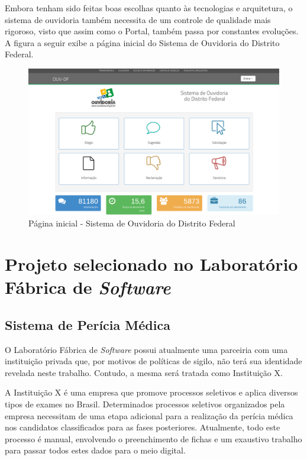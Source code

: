 Embora tenham sido feitas boas escolhas quanto às tecnologias e arquitetura, o sistema de ouvidoria também necessita de um controle de qualidade mais rigoroso, visto que assim como o Portal, também passa por constantes evoluções. A figura a seguir exibe a página inicial do Sistema de Ouvidoria do Distrito Federal.

\begin{figure}[h]
\includegraphics[width=\textwidth]{figuras/sistemaOuvidoria.png}
\caption{Página inicial - Sistema de Ouvidoria do Distrito Federal}
\end{figure}

\section{Projeto selecionado no Laboratório Fábrica de \textit{Software}}

\subsection{Sistema de Perícia Médica}

O Laboratório Fábrica de \textit{Software} possui atualmente uma parceiria com uma instituição privada que, por motivos de políticas de sigilo, não terá sua identidade revelada neste trabalho. Contudo, a mesma será tratada como Instituição X.

A Instituição X é uma empresa que promove processos seletivos e aplica diversos tipos de exames no Brasil. Determinados processos seletivos organizados pela empresa necessitam de uma etapa adicional para a realização da perícia médica nos candidatos classificados para as fases posteriores. Atualmente, todo este processo é manual, envolvendo o preenchimento de fichas e um exaustivo trabalho para passar todos estes dados para o meio digital.

